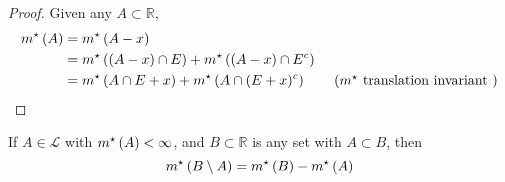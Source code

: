 \begin{proof}
    Given any $A \subset \mathbb{R}$,
    \begin{align*}
        \mstar{A} &= \mstar{A - x} \\
        &= \mstar{(A - x) \cap E} + \mstar{(A-x) \cap E^c}  \\
        &= \mstar{A \cap E + x} + \mstar{A \cap (E+x)^c} \tag{$m^{\star}$ translation invariant }
    \end{align*}
\end{proof}

\begin{remark}
    If $A \in \mathcal{L}$ with $m^{\star}\left(A\right) < \infty$, and $B \subset \mathbb{R}$ is any set with $A \subset B$, then
    \[
        m^{\star}\left(B \setminus A\right) = m^{\star}\left(B\right) - m^{\star}\left(A\right)
    \]
\end{remark}